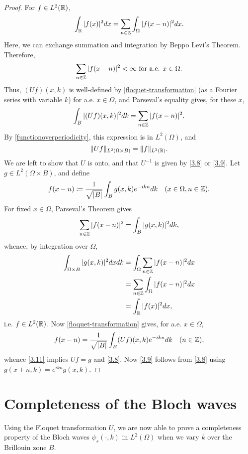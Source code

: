 \begin{theorem}
	\begin{proof}
		For $f \in L^{2}(\mathbb{R})$,
		\begin{equation}
			\int_{\mathbb{R}} |f(x)|^{2} dx = \sum_{n \in \mathbb{Z}} \int_{\Omega} |f(x - n)|^{2} dx. \label{functionoverperiodicity}
		\end{equation} 
		Here, we can exchange summation and integration by Beppo Levi's Theorem. Therefore, 
		\[ \sum_{n \in \mathbb{Z}} |f(x - n)|^{2} < \infty \text{ for a.e. } x \in \Omega.\]
		Thus, $(Uf)(x, k)$ is well-defined by \eqref{floquet-transformation} (as a Fourier series with variable $k$) for a.e. $x \in \Omega$, and Parseval's equality gives, for these $x$,
		\[ \int_{B}|(Uf)(x,k)|^{2} dk = \sum_{n \in \mathbb{Z}} |f(x - n)|^{2}. \]
		By \eqref{functionoverperiodicity}, this expression is in $L^{2}(\Omega)$, and
		\[ \| Uf \|_{L^{2}(\Omega \times B)} = \|f\|_{L^{2}(\mathbb{R})}. \]
		We are left to show that $U$ is onto, and that $U^{-1}$ is given by \eqref{3.8} or \eqref{3.9}. Let $g \in L^{2}(\Omega \times B)$, and define
		\begin{equation}
			f(x - n) \coloneqq \frac{1}{\sqrt{|B|}} \int_{B} g(x, k) e^{-ikn} dk \quad (x \in \Omega, n \in\mathbb{Z}).\label{3.11}
		\end{equation}
		For fixed $x \in \Omega$, Parseval's Theorem gives
		\[ \sum_{n \in \mathbb{Z}} |f(x - n)|^{2} = \int_{B} |g(x, k)|^{2} dk, \]
		whence, by integration over $\Omega$,
		\begin{eqnarray}
			\int_{\Omega \times B} |g(x, k)|^{2} dx dk & = \int_{\Omega} \sum_{n \in \mathbb{Z}} |f(x - n)|^{2} dx \\
				& = \sum_{n \in\mathbb{Z}} \int_{\Omega} |f(x-n)|^{2} dx \\
				& = \int_{\mathbb{R}} |f(x)|^{2} dx,	
		\end{eqnarray}
		i.e. $f \in L^{2}(\mathbb{R})$. Now \eqref{floquet-transformation} gives, for a.e. $x \in\Omega$,
		\[ f(x - n) = \frac{1}{\sqrt{|B|}} \int_{B} (Uf)(x,k) e^{-ikn} dk \quad (n \in \mathbb{Z}), \]
		whence \eqref{3.11} implies $U f = g$ and \eqref{3.8}. Now \eqref{3.9} follows from \eqref{3.8} using $g(x + n, k) = e^{ikn} g(x, k)$.
	\end{proof}				
\end{theorem}

\section{Completeness of the Bloch waves}

Using the Floquet transformation $U$, we are now able to prove a completeness property of the Bloch waves $\psi_{s}(\cdot, k)$ in $L^{2}(\Omega)$ when we vary $k$ over the Brillouin zone $B$.
	
